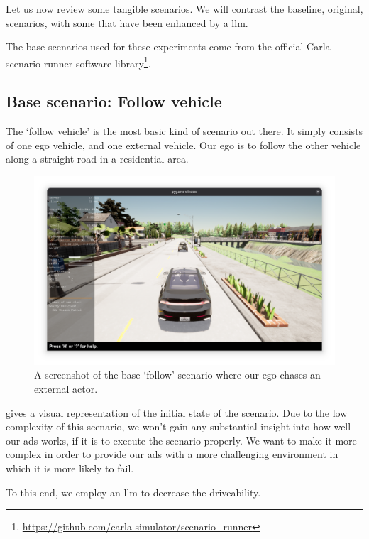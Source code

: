 Let us now review some tangible scenarios. We will contrast the baseline, original, scenarios, with
some that have been enhanced by a \acrshort{llm}.

The base scenarios used for these experiments come from the official Carla scenario runner software
library\footnote{\url{https://github.com/carla-simulator/scenario_runner}}.

\subsection{Base scenario: Follow vehicle}\label{sec:followVehicleResults}

The `follow vehicle' is the most basic kind of scenario out there. It simply consists of one ego
vehicle, and one external vehicle. Our ego is to follow the other vehicle along a straight road in a
residential area.

\begin{figure}[htbp]
    \centering
    \includegraphics[width=\textwidth]{experiment-material/follow-base-startpoint.png}
    \caption{A screenshot of the base `follow' scenario where our ego chases an external actor.}\label{fig:followBaseStartpoint}
\end{figure}

 gives a visual representation of the initial state of the scenario.
Due to the low complexity of this scenario, we won't gain any substantial insight into how well our
\acrshort{ads} works, if it is to execute the scenario properly. We want to make it more complex in
order to provide our \acrshort{ads} with a more challenging environment in which it is more likely
to fail.

To this end, we employ an \acrshort{llm} to decrease the driveability.

